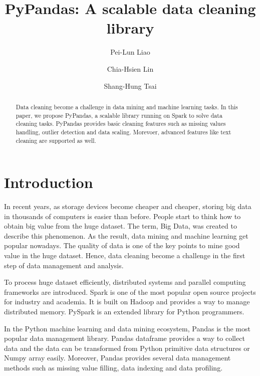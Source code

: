 \documentclass[sigconf]{acmart}
\begin{document}
\title{PyPandas: A scalable data cleaning library}

\author{Pei-Lun Liao}

\author{Chia-Hsien Lin}

\author{Shang-Hung Tsai}

\begin{abstract}
Data cleaning become a challenge\cite{datacleaning} in data mining and machine learning tasks. In this paper, we propose PyPandas, a scalable library running on Spark\cite{spark} to solve data cleaning tasks. PyPandas provides basic cleaning features such as missing values handling, outlier detection and data scaling. Morevoer, advanced features like text cleaning are supported as well.   

\end{abstract}

\maketitle

\section{Introduction}
In recent years, as storage devices become cheaper and cheaper, storing big data in thousands of computers is easier than before. People start to think how to obtain big value from the huge dataset. The term, Big Data, was created to describe this phenomenon\cite{bigdata}. As the result, data mining\cite{Han, MMD} and machine learning\cite{ml} get popular nowadays. The quality of data is one of the key points to mine good value in the huge dataset\cite{dataquality}. Hence, data cleaning become a challenge in the first step of data management and analysis\cite{datacleaning, DBS-045, PW}.
	
To process huge dataset efficiently, distributed systems and parallel computing frameworks\cite{mapreduce, gfs, hadoop} are introduced. Spark\cite{spark} is one of the most popular open source projects for industry and academia. It is built on Hadoop\cite{hadoop} and provides a way to manage distributed memory. PySpark\cite{pyspark} is an extended library for Python programmers.
	
In the Python machine learning and data mining ecosystem, Pandas\cite{pandas} is the most popular data management library. Pandas dataframe provides a way to collect data and the data can be transformed from Python primitive data structures or Numpy\cite{numpy} array easily. Moreover, Pandas provides several data management methods such as missing value filling, data indexing and data profiling. 
	
\end{document}
